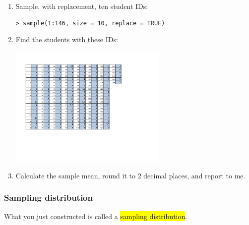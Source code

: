 \documentclass[slidestop,compress,mathserif,12pt,t,professionalfonts,xcolor=table]{beamer}
\newcommand{\soln}[1]{\textit{#1}}
\begin{document}
\begin{frame}[fragile]
\frametitle{}

\begin{enumerate}

\item Sample, with replacement, ten student IDs:
{\footnotesize
\begin{Verbatim}[frame=single, formatcom=\color{blue}]
> sample(1:146, size = 10, replace = TRUE)
\end{Verbatim}
}

\item Find the students with these IDs:

\begin{center}
\includegraphics[width=0.6\textwidth]{figures/no_drinks_drunk/no_drinks_drunk_clean}
\end{center}

\item Calculate the sample mean, round it to 2 decimal places, and report to me.

\end{enumerate}

\end{frame}


\begin{frame}[fragile]
\frametitle{Sampling distribution}

What you just constructed is called a \hl{sampling distribution}.

$\:$ \\

$\:$ \\
\soln{}

\end{frame}
\end{document}
